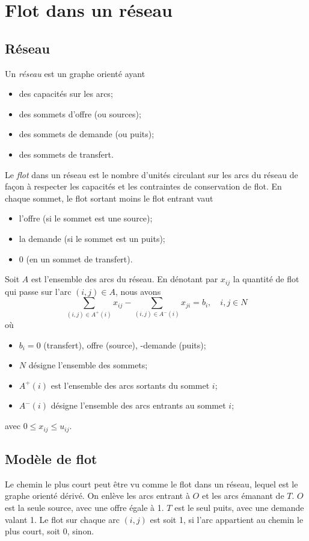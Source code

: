 \section{Flot dans un réseau}

\subsection{Réseau}

Un {\sl réseau} est un graphe orienté ayant
\begin{itemize}
 \item 
 des capacités sur les arcs;
 \item
 des sommets d'offre (ou sources);
 \item
 des sommets de demande (ou puits);
 \item
 des sommets de transfert.
\end{itemize}
Le {\sl flot} dans un réseau est le nombre d'unités circulant sur les arcs du réseau de façon à respecter les capacités et les contraintes de conservation de flot.
En chaque sommet, le flot sortant moins le flot entrant vaut
\begin{itemize}
 \item 
 l'offre (si le sommet est une source);
 \item
 la demande (si le sommet est un puits);
 \item
 0 (en un sommet de transfert).
\end{itemize}
Soit $A$ est l'ensemble des arcs du réseau.
En dénotant par $x_{ij}$ la quantité de flot qui passe sur l'arc $(i,j) \in A$, nous avons
\[
\sum_{(i,j) \in A^+(i)} x_{ij} - \sum_{(i,j) \in A^-(i) }x_{ji} = b_i,\quad i, j \in N
\]
où
\begin{itemize}
 \item 
 $b_i = 0$ (transfert), offre (source), -demande (puits);
 \item
 $N$ désigne l'ensemble des sommets;
 \item
 $A^+(i)$ est l'ensemble des arcs sortants du sommet $i$;
 \item
 $A^-(i)$ désigne l'ensemble des arcs entrants au sommet $i$;
\end{itemize}
avec $0 \leq x_{ij} \leq u_{ij}$.

\subsection{Modèle de flot}

Le chemin le plus court peut être vu comme le flot dans un réseau, lequel est le graphe orienté dérivé.
On enlève les arcs entrant à $O$ et les arcs émanant de $T$.
$O$ est la seule source, avec une offre égale à 1.
$T$ est le seul puits, avec une demande valant 1.
Le flot sur chaque arc $(i,j)$ est soit 1, si l'arc appartient au chemin le plus court, soit 0, sinon.

